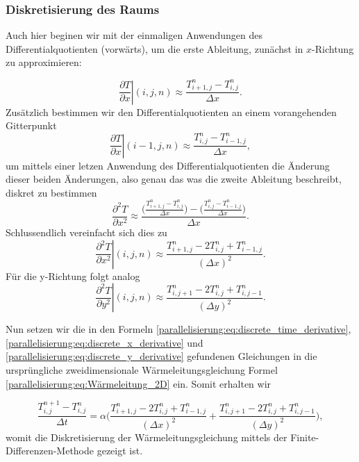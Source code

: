 \subsubsection{Diskretisierung des Raums}
Auch hier beginen wir mit der einmaligen Anwendungen des Differentialquotienten (vorwärts), um die erste Ableitung, zunächst in $x$-Richtung zu approximieren:

\begin{equation}
	\left. \frac{\partial T}{\partial x} \right|{(i,j,n)}
	\approx \frac{T_{i+1,j}^n - T_{i,j}^n}{\Delta x}.
\end{equation}
Zusätzlich bestimmen wir den Differentialquotienten an einem vorangehenden Gitterpunkt
\begin{equation}
	\left. \frac{\partial T}{\partial x} \right|{(i-1,j,n)}
	\approx \frac{T_{i,j}^n - T_{i-1,j}^n}{\Delta x},
\end{equation}
um mittels einer letzen Anwendung des Differentialquotienten die Änderung dieser beiden Änderungen, also genau das was die zweite Ableitung beschreibt, diskret zu bestimmen
\begin{equation}
	\frac{\partial^2 T}{\partial x^2} \approx
	\frac{ \biggl( \frac{T_{i+1,j}^n - T_{i,j}^n}{\Delta x} \biggr) - \biggl( \frac{T_{i,j}^n - T_{i-1,j}^n}{\Delta x} \biggr) }{\Delta x}.
\end{equation}
Schlussendlich vereinfacht sich dies zu 
\begin{equation}
	\label{parallelisierung:eq:discrete_x_derivative}
	\left. \frac{\partial^2 T}{\partial x^2} \right|{(i,j,n)} \approx \frac{T_{i+1,j}^n - 2T_{i,j}^n + T_{i-1,j}^n}{(\Delta x)^2}.
\end{equation}
Für die y-Richtung folgt analog
\begin{equation}
	\label{parallelisierung:eq:discrete_y_derivative}
	\left. \frac{\partial^2 T}{\partial y^2} \right|{(i,j,n)} \approx \frac{T_{i,j+1}^n - 2T_{i,j}^n + T_{i,j-1}^n}{(\Delta y)^2}.
\end{equation}


Nun setzen wir die in den Formeln \eqref{parallelisierung:eq:discrete_time_derivative},  \eqref{parallelisierung:eq:discrete_x_derivative} und \eqref{parallelisierung:eq:discrete_y_derivative} gefundenen Gleichungen in die ursprüngliche zweidimensionale Wärmeleitungsgleichung Formel \eqref{parallelisierung:eq:Wärmeleitung_2D} ein.
Somit erhalten wir 

\begin{equation}
	\label{parallelisierung:eq:update_formula_unsorted}
	\frac{T_{i,j}^{n+1} - T_{i,j}^n}{\Delta t}
	=
	\alpha \biggl(
	\frac{T_{i+1,j}^n - 2 T_{i,j}^n + T_{i-1,j}^n}{(\Delta x)^2}
	+
	\frac{T_{i,j+1}^n - 2 T_{i,j}^n + T_{i,j-1}^n}{(\Delta y)^2}
	\biggr),
\end{equation}
womit die Diskretisierung der Wärmeleitungsgleichung mittels der Finite-Differenzen-Methode gezeigt ist.

